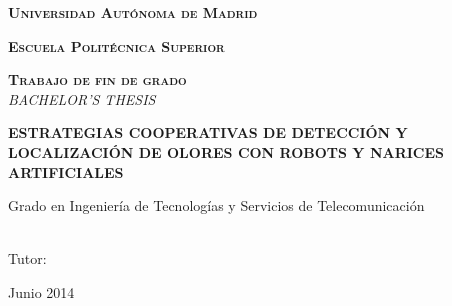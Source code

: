 \begin{titlepage}
\setcounter{page}{0}

\begin{center}

\vspace*{-2.2cm}

\LARGE \textbf{\textsc{Universidad Aut\'onoma de Madrid}}\\

\vspace{.2cm}

\Large \textbf{\textsc{Escuela Polit\'ecnica Superior}}\\

\vspace{0.5cm}

\begin{figure}[h]
    \begin{center}
        \begin{minipage}[c]{0.495\linewidth}
        \end{minipage}
        \begin{minipage}[c]{0.495\linewidth}
        \end{minipage}
    \end{center}
    \label{fig:Escudos}
\end{figure}


\LARGE \textbf{\textsc{Trabajo de fin de grado}}\\
\normalsize \textsc{\textit{BACHELOR'S THESIS}}\\

\vspace{2.5cm}

\large \MakeUppercase{\textbf{Estrategias cooperativas de detecci\'on y localizaci\'on de olores con robots y narices artificiales}}

\large \MakeUppercase{\textit{\titulo}}

\vspace{2.2cm}

\large{Grado en Ingenier\'ia de Tecnolog\'ias y Servicios de Telecomunicaci\'on}\\
\normalsize\textit{\carrera}

\vspace{1cm}

\Large \textbf\autor \\
\vspace{0.5cm}
\large Tutor: \textbf\tutor \\

\vspace{0.5cm}

\LARGE Junio 2014

\end{center}

\end{titlepage}

\normalsize

\newpage \thispagestyle{empty} %
\setcounter{page}{0}


